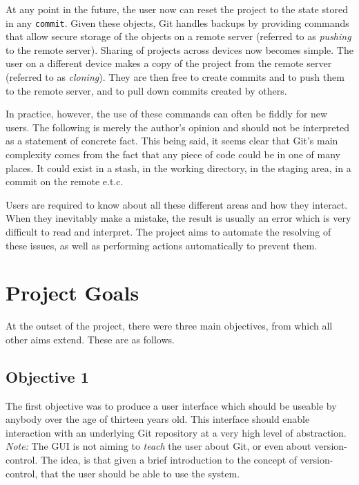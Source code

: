 At any point in the future, the user now can reset the project to the state stored in any \texttt{commit}. Given these objects, Git handles backups by providing commands that allow secure storage of the objects on a remote server (referred to as \emph{pushing} to the remote server). Sharing of projects across devices now becomes simple. The user on a different device makes a copy of the project from the remote server (referred to as \emph{cloning}). They are then free to create commits and to push them to the remote server, and to pull down commits created by others.

In practice, however, the use of these commands can often be fiddly for new users.  The following is merely the author's opinion and should not be interpreted as a statement of concrete fact. This being said, it seems clear that Git's main complexity comes from the fact that any piece of code could be in one of many places. It could exist in a stash, in the working directory, in the staging area, in a commit on the remote e.t.c.

Users are required to know about all these different areas and how they interact. When they inevitably make a mistake, the result is usually an error which is very difficult to read and interpret. The project aims to automate the resolving of these issues, as well as performing actions automatically to prevent them.

\section{Project Goals}\label{sec:projectgoals}

At the outset of the project, there were three main objectives, from which all other aims extend. These are as follows.\\

\subsection{Objective 1} 

The first objective was to produce a user interface which should be useable by anybody over the age of thirteen years old. This interface should enable interaction with an underlying Git repository at a very high level of abstraction. \emph{Note:} The GUI is not aiming to \emph{teach} the user about Git, or even about version-control. The idea, is that given a brief introduction to the concept of version-control, that the user should be able to use the system.

